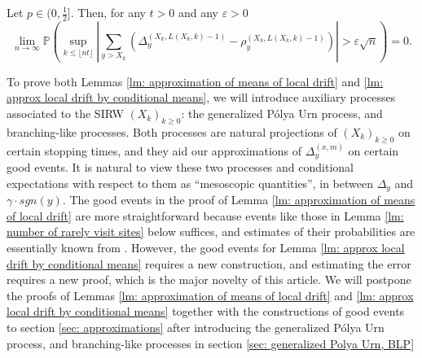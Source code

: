 \documentclass[EJP]{ejpecp} %
\newcommand{\abs}[1]{\left\vert #1 \right\vert}
\begin{document}
\begin{lemma}\label{lm: approx local drift by conditional means}
	Let $p\in (0,\frac{1}{2}]$. Then, for any $t>0$ and any $\varepsilon >0$
	\begin{equation}\label{eq: control of martingale difference for local drift}
		\lim_{n \to \infty }\mathbb{P}\left(\sup_{k\leq\lfloor nt \rfloor} \abs{\sum_{y> X_k} \left(\Delta_{y}^{(X_k,L(X_k,k)-1)}- \rho_{y}^{(X_k,L(X_k,k)-1)} \right)   }  > \varepsilon \sqrt{n}  \right) =0. 
	\end{equation}
\end{lemma}



To prove both Lemmas \ref{lm: approximation of means of local drift} and \ref{lm: approx local drift by conditional means}, we will introduce auxiliary processes associated to the SIRW $(X_k)_{k\geq 0}$: the generalized P\'{o}lya Urn process, and branching-like processes. Both processes are natural projections of $(X_k)_{k\geq 0}$ on certain stopping times, and they aid our approximations of $\Delta_{y}^{(x,m)}$ on certain good events. 
It is natural to view these two processes and conditional expectations with respect to them as ``mesoscopic quantities'', in between $\Delta_y$ and $\gamma\cdot sgn(y)$.
The good events in the proof of Lemma \ref{lm: approximation of means of local drift} are more straightforward because events like those in Lemma \ref{lm: number of rarely visit sites} below suffices, and estimates of their probabilities are essentially known from \cite{KMP23}. However, the good events for Lemma \ref{lm: approx local drift by conditional means} requires a new construction, and estimating the error requires a new proof, which is the major novelty of this article. We will postpone the proofs of Lemmas \ref{lm: approximation of means of local drift} and \ref{lm: approx local drift by conditional means} together with the constructions of good events to section \ref{sec: approximations} after introducing the generalized P\'{o}lya Urn process, and branching-like processes in section \ref{sec: generalized Polya Urn, BLP}
\end{document}
